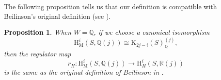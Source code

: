 \documentclass[11pt, a4paper]{amsart}
\theoremstyle{plain}
\newtheorem{proposition}[theorem]{Proposition}
\theoremstyle{definition}
\numberwithin{equation}{section}
\def\QQ{\mathbb{Q}}
\def\RR{\mathbb{R}}
\begin{document}
The following proposition tells us that our definition is compatible with Beilinson's original definition (see \cite[\S 2]{Beilinson_conjecture_original}). 
 \begin{proposition}
 \label{Prop: compatible with Beilinson regulator}
 When $W = \QQ$, if we choose a canonical isomorphism 
 \begin{equation*}
     \mathrm{H}_{\mathrm{M}}^{i}(S, \QQ(j)) \cong \mathrm{K}_{2j-i}(S)_{\QQ}^{(j)},
 \end{equation*}
 then the regulator map 
 \begin{equation*}
     r_{H} \colon \mathrm{H}_{\mathrm{M}}^{i}(S,\QQ(j)) \rightarrow  \mathrm{H}^{i}_{H}(S, \RR(j))
 \end{equation*}
 is the same as the original definition of Beilinson in \textnormal{\cite[\S 2]{Beilinson_conjecture_original}}. 
     
 \end{proposition}
\end{document}
